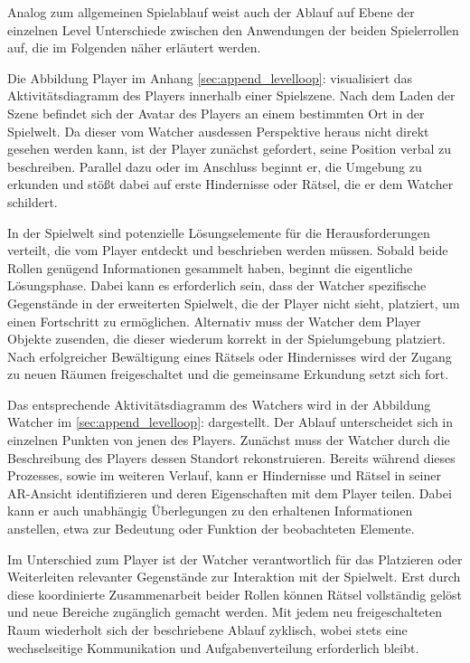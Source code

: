 Analog zum allgemeinen Spielablauf weist auch der Ablauf auf Ebene der einzelnen Level Unterschiede zwischen den Anwendungen der beiden Spielerrollen auf, die im Folgenden näher erläutert werden. 

Die Abbildung Player im Anhang \ref{sec:append_levelloop}:  visualisiert das Aktivitätsdiagramm des Players innerhalb einer Spielszene. Nach dem Laden der Szene befindet sich der Avatar des Players an einem bestimmten Ort in der Spielwelt. Da dieser vom Watcher ausdessen Perspektive heraus nicht direkt gesehen werden kann, ist der Player zunächst gefordert, seine Position verbal zu beschreiben. Parallel dazu oder im Anschluss beginnt er, die Umgebung zu erkunden und stößt dabei auf erste Hindernisse oder Rätsel, die er dem Watcher schildert. 

In der Spielwelt sind potenzielle Lösungselemente für die Herausforderungen verteilt, die vom Player entdeckt und beschrieben werden müssen. Sobald beide Rollen genügend Informationen gesammelt haben, beginnt die eigentliche Lösungsphase. Dabei kann es erforderlich sein, dass der Watcher spezifische Gegenstände in der erweiterten Spielwelt, die der Player nicht sieht, platziert, um einen Fortschritt zu ermöglichen. Alternativ muss der Watcher dem Player Objekte zusenden, die dieser wiederum korrekt in der Spielumgebung platziert. Nach erfolgreicher Bewältigung eines Rätsels oder Hindernisses wird der Zugang zu neuen Räumen freigeschaltet und die gemeinsame Erkundung setzt sich fort.

Das entsprechende Aktivitätsdiagramm des Watchers wird in der Abbildung Watcher im \ref{sec:append_levelloop}:  dargestellt. Der Ablauf unterscheidet sich in einzelnen Punkten von jenen des Players. Zunächst muss der Watcher durch die Beschreibung des Players dessen Standort rekonstruieren. Bereits während dieses Prozesses, sowie im weiteren Verlauf, kann er Hindernisse und Rätsel in seiner \ac{AR}-Ansicht identifizieren und deren Eigenschaften mit dem Player teilen. Dabei kann er auch unabhängig Überlegungen zu den erhaltenen Informationen anstellen, etwa zur Bedeutung oder Funktion der beobachteten Elemente.

Im Unterschied zum Player ist der Watcher verantwortlich für das Platzieren oder Weiterleiten relevanter Gegenstände zur Interaktion mit der Spielwelt. Erst durch diese koordinierte Zusammenarbeit beider Rollen können Rätsel vollständig gelöst und neue Bereiche zugänglich gemacht werden. Mit jedem neu freigeschalteten Raum wiederholt sich der beschriebene Ablauf zyklisch, wobei stets eine wechselseitige Kommunikation und Aufgabenverteilung erforderlich bleibt.



